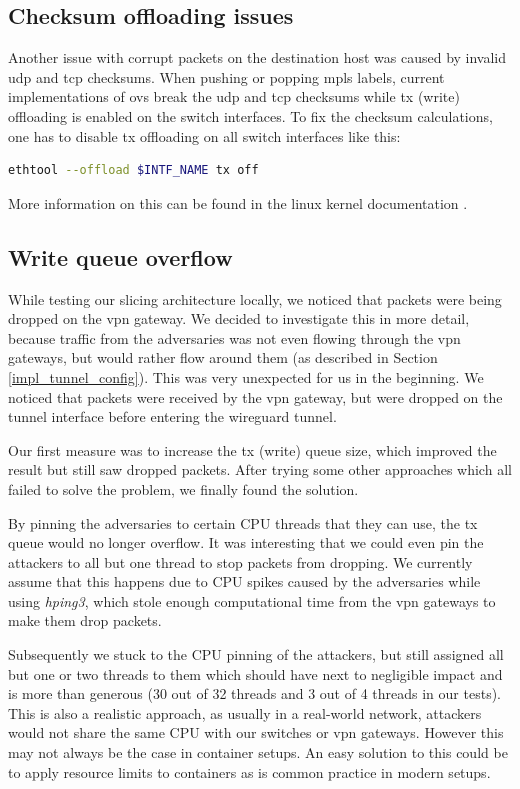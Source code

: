 \subsection{Checksum offloading issues}
Another issue with corrupt packets on the destination host was caused by invalid \acrshort{udp} and \acrshort{tcp} checksums. When pushing or popping \acrshort{mpls} labels, current implementations of \Gls{ovs} break the \acrshort{udp} and \acrshort{tcp} checksums while \acrshort{tx} (write) offloading is enabled on the switch interfaces. To fix the checksum calculations, one has to disable \acrshort{tx} offloading on all switch interfaces like this:

\begin{lstlisting}[language=bash]
ethtool --offload $INTF_NAME tx off
\end{lstlisting}

More information on this can be found in the linux kernel documentation \cite{txoffload}.

\subsection{Write queue overflow}
While testing our slicing architecture locally, we noticed that packets were being dropped on the \acrshort{vpn} gateway. We decided to investigate this in more detail, because traffic from the adversaries was not even flowing through the \acrshort{vpn} gateways, but would rather flow around them (as described in Section \ref{impl_tunnel_config}). This was very unexpected for us in the beginning. We noticed that packets were received by the \acrshort{vpn} gateway, but were dropped on the tunnel interface before entering the \gls{wireguard} tunnel.

Our first measure was to increase the \acrshort{tx} (write) queue size, which improved the result but still saw dropped packets. After trying some other approaches which all failed to solve the problem, we finally found the solution.

By pinning the adversaries to certain CPU threads that they can use, the \acrshort{tx} queue would no longer overflow. It was interesting that we could even pin the attackers to all but one thread to stop packets from dropping. We currently assume that this happens due to CPU spikes caused by the adversaries while using \textit{hping3}, which stole enough computational time from the \acrshort{vpn} gateways to make them drop packets.

Subsequently we stuck to the CPU pinning of the attackers, but still assigned all but one or two threads to them which should have next to negligible impact and is more than generous (30 out of 32 threads and 3 out of 4 threads in our tests). This is also a realistic approach, as usually in a real-world network, attackers would not share the same CPU with our switches or \acrshort{vpn} gateways. However this may not always be the case in container setups. An easy solution to this could be to apply resource limits to containers as is common practice in modern setups.
